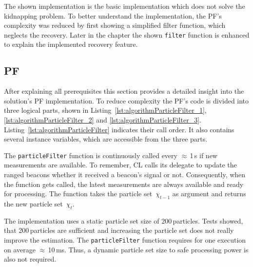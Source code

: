 The shown implementation is the basic implementation which does not solve the kidnapping problem. To better understand the implementation, the \acs{PF}'s complexity was reduced by first showing a simplified filter function, which neglects the recovery. Later in the chapter the shown \texttt{filter} function is enhanced to explain the implemented recovery feature.




\subsection{\acl{PF}}



After explaining all prerequisites this section provides a detailed insight into the solution's \acl{PF} implementation. To reduce complexity the \acs{PF}'s code is divided into three logical parts, shown in Listing~\ref{lst:algorithmParticleFilter_1}, \ref{lst:algorithmParticleFilter_2} and \ref{lst:algorithmParticleFilter_3}. Listing~\ref{lst:algorithmParticleFilter} indicates their call order. It also contains several instance variables, which are accessible from the three parts.

The \texttt{particleFilter} function is continuously called every $\approx$\,1\,s if new measurements are available. To remember, \ac{CL} calls its delegate to update the ranged beacons whether it received a beacon's signal or not. Consequently, when the function gets called, the latest measurements are always available and ready for processing. The function takes the particle set~$\chi_{t-1}$ as argument and returns the new particle set~$\chi_t$.

The implementation uses a static particle set size of 200\,particles. Tests showed, that 200\,particles are sufficient and increasing the particle set does not really improve the estimation. The \texttt{particleFilter} function requires for one execution on average $\approx$\,10\,ms. Thus, a dynamic particle set size to safe processing power is also not required.


